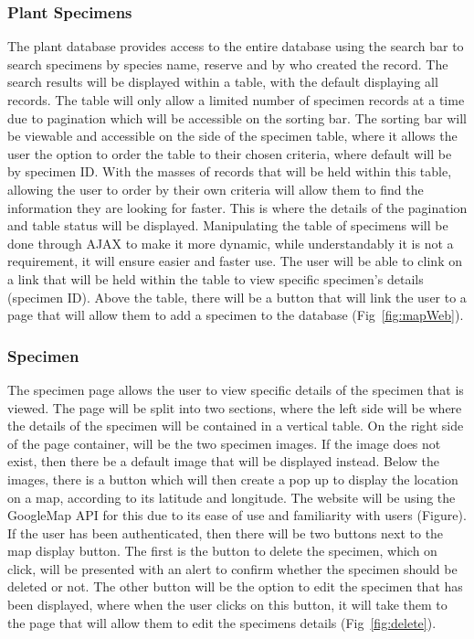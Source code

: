         \subsubsection{Plant Specimens}
           The plant database provides access to the entire database using the search bar to search specimens by species name, reserve and by who created the record. The search results will be displayed within a table, with the default displaying all records. The table will only allow a limited number of specimen records at a time due to pagination which will be accessible on the sorting bar. The sorting bar will be viewable and accessible on the side of the specimen table, where it allows the user the option to order the table to their chosen criteria, where default will be by specimen ID. With the masses of records that will be held within this table, allowing the user to order by their own criteria will allow them to find the information they are looking for faster. This is where the details of the pagination and table status will be displayed. Manipulating the table of specimens will be done through AJAX to make it more dynamic, while understandably it is not a requirement, it will ensure easier and faster use.
The user will be able to clink on a link that will be held within the table to view specific specimen’s details (specimen ID). Above the table, there will be a button that will link the user to a page that will allow them to add a specimen to the database
(Fig~\ref{fig:mapWeb}).

        \subsubsection{Specimen}
     The specimen page allows the user to view specific details of the specimen that is viewed. The page will be split into two sections, where the left side will be where the details of the specimen will be contained in a vertical table. On the right side of the page container, will be the two specimen images. If the image does not exist, then there be a default image that will be displayed instead. Below the images, there is a button which will then create a pop up to display the location on a map, according to its latitude and longitude. The website will be using the GoogleMap API for this due to its ease of use and familiarity with users (Figure). If the user has been authenticated, then there will be two buttons next to the map display button. The first is the button to delete the specimen, which on click, will be presented with an alert to confirm whether the specimen should be deleted or not. The other button will be the option to edit the specimen that has been displayed, where when the user clicks on this button, it will take them to the page that will allow them to edit the specimens details  (Fig~\ref{fig:delete}).

